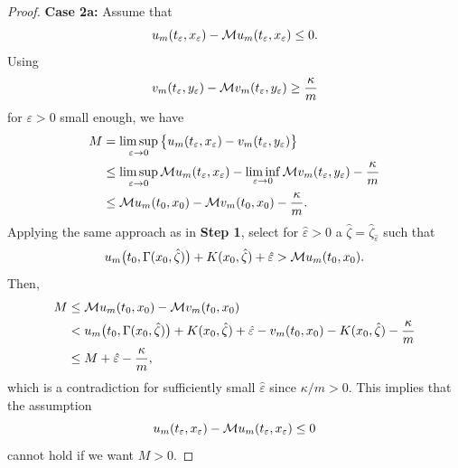 \begin{proof}
    \textbf{Case 2a:} Assume that 
    \begin{equation*}
        u_m(t_\varepsilon,x_\varepsilon) - \mathcal{M} u_m(t_\varepsilon,x_\varepsilon) \leq 0.
    \end{equation*}
    Using 
    \begin{equation*}
        v_m(t_\varepsilon,y_\varepsilon) - \mathcal{M} v_m(t_\varepsilon,y_\varepsilon) \geq \frac{\kappa}{m}
    \end{equation*}
    for $\varepsilon>0$ small enough, we have
    \begin{align*}
        M &= \limsup_{\varepsilon \rightarrow 0} \big\{ u_m(t_\varepsilon,x_\varepsilon) - v_m(t_\varepsilon,y_\varepsilon) \big\}\\
        & \leq \limsup_{\varepsilon \rightarrow 0} \mathcal{M} u_m(t_\varepsilon,x_\varepsilon) - \liminf_{\varepsilon \rightarrow 0} \mathcal{M} v_m(t_\varepsilon,y_\varepsilon) - \frac{\kappa}{m} \\
        & \leq \mathcal{M} u_m(t_0,x_0) - \mathcal{M} v_m(t_0,x_0) - \frac{\kappa}{m}.
    \end{align*}
    Applying the same approach as in \textbf{Step 1}, select for $\hat \varepsilon > 0$ a $\hat \zeta = \hat \zeta_{\hat \varepsilon}$ such that 
    \begin{equation*}
        u_m\big(t_0, \Gamma(x_0,\hat \zeta) \big) + K(x_0, \hat \zeta) + \hat \varepsilon > \mathcal{M} u_m(t_0,x_0).    
    \end{equation*}
    Then, 
    \begin{align*}
        M &\leq \mathcal{M} u_m(t_0,x_0) - \mathcal{M} v_m(t_0,x_0) \\
        &< u_m\big(t_0, \Gamma(x_0,\hat \zeta) \big) + K(x_0,\hat \zeta) + \hat \varepsilon - v_m(t_0,x_0) - K(x_0, \hat \zeta) - \frac{\kappa}{m} \\
        & \leq M + \hat \varepsilon - \frac{\kappa}{m},
    \end{align*}
    which is a contradiction for sufficiently small $\hat \varepsilon$ since $\kappa/m > 0$. This implies that the assumption 
    \begin{equation*}
        u_m(t_\varepsilon,x_\varepsilon) - \mathcal{M} u_m(t_\varepsilon,x_\varepsilon) \leq 0
    \end{equation*}
    cannot hold if we want $M>0$. 


\end{proof}
